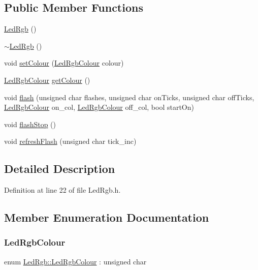 \subsection*{Public Member Functions}
\begin{DoxyCompactItemize}
\item 
\hyperlink{class_led_rgb_a6393b6af61bd195db3591d4e90a2b6e2}{Led\+Rgb} ()
\item 
\hyperlink{class_led_rgb_a4fac00de3a6801fd9da322eab7e04765}{$\sim$\+Led\+Rgb} ()
\item 
void \hyperlink{class_led_rgb_a1bc08ef61237fad334dcc750aa445e36}{set\+Colour} (\hyperlink{class_led_rgb_af328c665510f921f0dfed643f939087b}{Led\+Rgb\+Colour} colour)
\item 
\hyperlink{class_led_rgb_af328c665510f921f0dfed643f939087b}{Led\+Rgb\+Colour} \hyperlink{class_led_rgb_a542e3bf6bcf1f05df3cc442522787948}{get\+Colour} ()
\item 
void \hyperlink{class_led_rgb_a8d81b6020efb6e5f786542451d4dffbc}{flash} (unsigned char flashes, unsigned char on\+Ticks, unsigned char off\+Ticks, \hyperlink{class_led_rgb_af328c665510f921f0dfed643f939087b}{Led\+Rgb\+Colour} on\+\_\+col, \hyperlink{class_led_rgb_af328c665510f921f0dfed643f939087b}{Led\+Rgb\+Colour} off\+\_\+col, bool start\+On)
\item 
void \hyperlink{class_led_rgb_a096a0af0eb4d3c5d4c6a3f4b3aaeb9e7}{flash\+Stop} ()
\item 
void \hyperlink{class_led_rgb_a31cf89e0117af309c00a60a7ca1bf486}{refresh\+Flash} (unsigned char tick\+\_\+inc)
\end{DoxyCompactItemize}


\subsection{Detailed Description}


Definition at line 22 of file Led\+Rgb.\+h.



\subsection{Member Enumeration Documentation}
\mbox{\label{class_led_rgb_af328c665510f921f0dfed643f939087b}} 
\subsubsection{\texorpdfstring{Led\+Rgb\+Colour}{LedRgbColour}}
{\footnotesize\ttfamily enum \hyperlink{class_led_rgb_af328c665510f921f0dfed643f939087b}{Led\+Rgb\+::\+Led\+Rgb\+Colour} \+: unsigned char}

